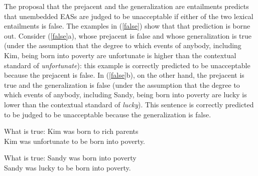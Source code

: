 \documentclass[11pt,fleqn]{article}
\def\infelic{{\leavevmode\llap{\#}}}
\newcommand{\6}{\mbox{$[\hspace*{-.6mm}[$}}
\newcommand{\9}{\mbox{$]\hspace*{-.6mm}]$}}
\begin{document}

The proposal that the prejacent and the generalization are entailments predicts that unembedded EASs are judged to be unacceptable if either of the two lexical entailments is false. The examples in (\ref{false}) show that that prediction is borne out. Consider (\ref{false}a), whose prejacent is false and whose generalization is true (under the assumption that the degree to which events of anybody, including Kim, being born into poverty are unfortunate is higher than the contextual standard of {\em unfortunate}): this example is correctly predicted to be unacceptable because the prejacent is false. In (\ref{false}b), on the other hand, the prejacent is true and the generalization is false (under the assumption that the degree to which events of anybody, including Sandy, being born into poverty are lucky is lower than the contextual standard of {\em lucky}). This sentence is correctly predicted to be judged to be unacceptable because the generalization is false. 

\begin{exe}
\ex\label{false}
\begin{xlist}
\ex What is true: Kim was born to rich parents
\\ \infelic Kim was unfortunate to be born into poverty.

\ex What is true: Sandy was born into poverty
\\ \infelic Sandy was lucky to be born into poverty.

\end{xlist}
\end{exe}

\end{document}
